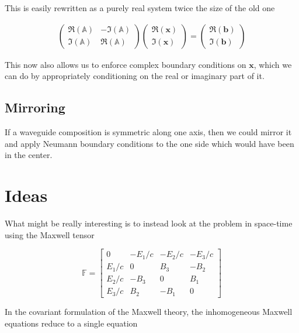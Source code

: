 \documentclass[11pt, a4paper]{article}
\begin{document}
This is easily rewritten as a purely real system twice the size of the old one 

\begin{align}
    \begin{pmatrix} \Re(\mathbb{A}) & - \Im(\mathbb{A}) \\ 
                    \Im(\mathbb{A}) & \Re(\mathbb{A}) \end{pmatrix}
    \begin{pmatrix} \Re(\mathbf{x}) \\ \Im(\mathbf{x}) \end{pmatrix}
    = 
    \begin{pmatrix} \Re(\mathbf{b}) \\ \Im(\mathbf{b}) \end{pmatrix}
\end{align}

This now also allows us to enforce complex boundary conditions on $\mathbf{x}$,
which we can do by appropriately conditioning on the real or imaginary part of it.

\subsection{Mirroring}
\label{subsec:mirroring}

If a waveguide composition is symmetric along one axis, then we could mirror it
and apply Neumann boundary conditions to the one side which would have been in 
the center.

\section{Ideas}
\label{sec:ideas}

What might be really interesting is to instead look at the problem in space-time 
using the Maxwell tensor

\begin{equation}
    \mathbb{F} = \begin{bmatrix}
        0 & -E_1/c & -E_2/c & -E_3/c \\
        E_1/c & 0 & B_3 & -B_2 \\ 
        E_2/c & -B_3 & 0 & B_1 \\ 
        E_3/c & B_2 & -B_1 & 0
    \end{bmatrix}
\end{equation}

In the covariant formulation of the Maxwell theory, the inhomogeneous Maxwell
equations reduce to a single equation
\end{document}
